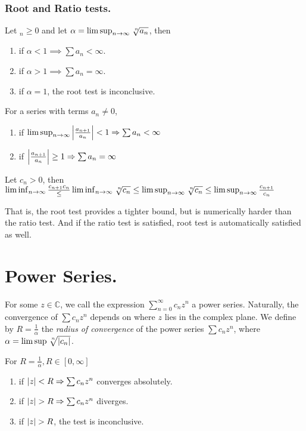 \subsubsection{Root and Ratio tests.}
\begin{theorem}
Let $_n\geq 0$ and let $\alpha = \limsup_{n\to\infty} \sqrt[\leftroot{-2}\uproot{2}n]{a_n}$, then
\begin{enumerate}[label=(\alph*)]
    \item if $\alpha < 1 \implies \sum a_n < \infty$.
    \item if $\alpha > 1 \implies \sum a_n = \infty$.
    \item if $\alpha = 1$, the root test is inconclusive.
\end{enumerate}
\end{theorem}

\begin{theorem}
For a series with terms $a_n\neq0$, 
\begin{enumerate}[label=(\alph*)]
    \item if $\limsup_{n\to\infty} \left\lvert\frac{a_{n+1}}{a_n}\right\rvert< 1\Rightarrow \sum a_n < \infty$
    \item if $\left\lvert\frac{a_{n+1}}{a_n}\right\rvert \geq 1\Rightarrow \sum a_n = \infty$
\end{enumerate}
\end{theorem}

\begin{remark}
Let $c_n>0$, then\\
$\liminf_{n\to \infty} \frac{c_{n+1}{c_n}} \leq \liminf_{n\to \infty} \sqrt[\leftroot{-2}\uproot{2}n]{c_n} \leq \limsup_{n\to \infty} \sqrt[\leftroot{-2}\uproot{2}n]{c_n} \leq \limsup_{n\to \infty} \frac{c_{n+1}}{c_n}$
\end{remark}
That is, the root test provides a tighter bound, but is numerically harder than the ratio test.
And if the ratio test is satisfied, root test is automatically satisfied as well.

\section{Power Series.}
For some $z\in \mathbb{C}$, we call the expression $\sum_{n=0}^\infty c_n z^n$ a power series.
Naturally, the convergence of $\sum c_n z^n$ depends on where $z$ lies in the complex plane.
We define by $R=\frac{1}{\alpha}$ the \textit{radius of convergence} of the power series $\sum c_n z^n$, where $\alpha = \limsup \sqrt[\leftroot{-2}\uproot{2}n]{\abs{c_n}}$.
\begin{theorem}
For $R=\frac{1}{\alpha}, R\in [0,\infty]$
\begin{enumerate}[label=(\roman*)]
    \item if $\left\lvert z\right\rvert<R\Rightarrow \sum c_n z^n$ converges absolutely.
     \item if $\left\lvert z\right\rvert>R\Rightarrow \sum c_n z^n$ diverges.
     \item if $\left\lvert z\right\rvert>R$, the test is inconclusive.
\end{enumerate}
\end{theorem}

